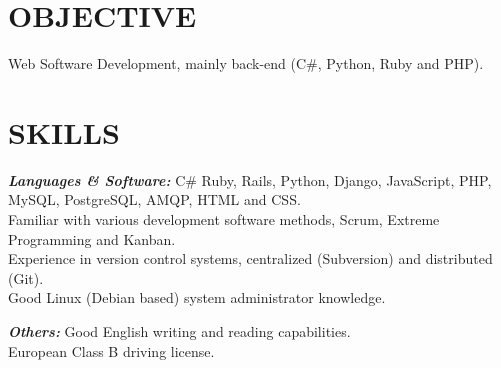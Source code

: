 \documentclass[line,margin]{resume}
\begin{document}
\address{Currently living in Porto, Portugal}
\address{helder.tavares.silva@gmail.com or +351917534732}

\begin{resume}

\section{OBJECTIVE} Web Software Development, mainly back-end (C\#, Python, Ruby and PHP).

\section{SKILLS}
    {\sl\bf Languages \& Software:}
        C\# Ruby, Rails, Python, Django, JavaScript, PHP, MySQL, PostgreSQL, AMQP, HTML and CSS.\\
        Familiar with various development software methods, Scrum, Extreme Programming and Kanban.\\
        Experience in version control systems, centralized (Subversion) and distributed (Git).\\
        Good Linux (Debian based) system administrator knowledge.

    {\sl\bf Others:}
        Good English writing and reading capabilities.\\
        European Class B driving license.


\end{resume}
\end{document}
